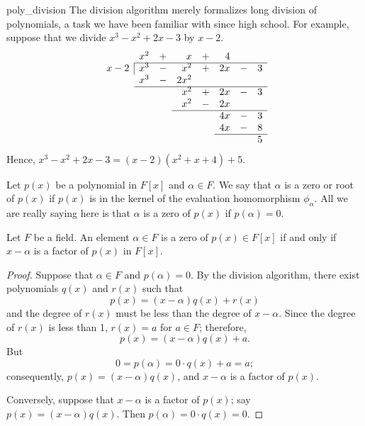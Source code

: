  
\begin{example}{poly_division}
The division algorithm merely formalizes long division of polynomials,
a task we have been familiar with since high school. For example,
suppose that we divide $x^3 - x^2 + 2 x - 3$ by $x - 2$.  
$$
\begin{array}{rrcrcrcr}
        &  x^2  &  +  &      x  &  +  &    4  &     &     \\ \cline{2-8}
 \multicolumn{1}{r|}{x - 2}
  &  x^3  &  -  &    x^2  &  +  &  2 x  &  -  &  3  \\
        &  x^3  &  -  &  2 x^2  &     &       &     &     \\ \cline{2-8}
        &       &     &    x^2  &  +  &  2 x  &  -  &  3  \\
        &       &     &    x^2  &  -  &  2 x  &     &     \\ \cline{4-8}
        &       &     &         &     &  4 x  &  -  &  3  \\
        &       &     &         &     &  4 x  &  -  &  8  \\ \cline{6-8}
        &       &     &         &     &       &     &  5 
\end{array}
$$
Hence, $x^3 - x^2 + 2 x - 3 = (x - 2) (x^2 + x + 4 ) + 5$.
\end{example}

 
 
Let $p(x)$ be a polynomial in $F[x]$ and $\alpha \in F$.  We say that
$\alpha$ is a {\bfi zero\/} or {\bfi root\/} of $p(x)$ if
$p(x)$ is in the kernel of the evaluation homomorphism
$\phi_{\alpha}$. All we are really saying here is that $\alpha$ is a
zero of $p(x)$ if $p(\alpha) = 0$.  
 
 
\begin{corollary}
Let $F$ be a field.
An element $\alpha \in F$ is a zero of $p(x) \in F[x]$ if and only if
$x - \alpha$ is a factor of $p(x)$ in $F[x]$. 
\end{corollary}
 
 
\begin{proof}
Suppose that $\alpha \in F$ and $p( \alpha ) = 0$. By the division
algorithm, there exist polynomials $q(x)$ and $r(x)$ such that
$$
p(x) = (x -\alpha) q(x) + r(x)
$$
and the degree of $r(x)$ must be less than the degree of $x -\alpha$.
Since the degree of $r(x)$ is less than 1, $r(x) = a$ for $a \in F$;
therefore, 
$$
p(x) = (x -\alpha) q(x) + a.
$$
But 
$$
0 = p(\alpha) = 0 \cdot q(x) + a = a;
$$
consequently, $p(x) = (x - \alpha) q(x)$, and $x - \alpha$ is a factor 
of $p(x)$.
 
 
Conversely, suppose that $x - \alpha$ is a factor of $p(x)$; say $p(x)
= (x - \alpha) q(x)$. Then $p( \alpha ) = 0 \cdot q(x) = 0$. 
\end{proof}
 
